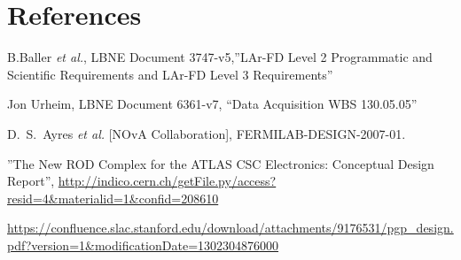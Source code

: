 
\section{References}

\begin{thebibliography}{99}

 B.Baller {\it et al.}, LBNE Document 3747-v5,''LAr-FD Level 2 Programmatic and
Scientific Requirements and LAr-FD Level 3 Requirements''

 Jon Urheim, LBNE Document 6361-v7, ``Data Acquisition WBS 130.05.05''

  D.~S.~Ayres {\it et al.}  [NOvA Collaboration],
  FERMILAB-DESIGN-2007-01.

''The New ROD Complex for the ATLAS CSC Electronics: Conceptual Design Report'',
\url{http://indico.cern.ch/getFile.py/access?resid=4&materialid=1&confid=208610}

\url{https://confluence.slac.stanford.edu/download/attachments/9176531/pgp_design.pdf?version=1&modificationDate=1302304876000}
	               
\end{thebibliography} 